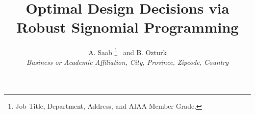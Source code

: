  \title{Optimal Design Decisions via Robust Signomial Programming}

 \author{
  A. Saab%
    \thanks{Job Title, Department, Address, and AIAA Member Grade.}
  \ and B. Ozturk\\
  {\normalsize\itshape
   Business or Academic Affiliation, City, Province, Zipcode, Country}\\
 }


 \newcommand{\eqnref}[1]{(\ref{#1})}
 \newcommand{\class}[1]{\texttt{#1}}
 \newcommand{\package}[1]{\texttt{#1}}
 \newcommand{\file}[1]{\texttt{#1}}
 \newcommand{\BibTeX}{\textsc{Bib}\TeX}

\renewcommand{\vec}{\mathbf}
\newcommand{\mat}{\mathbf}

\usepackage[utf8]{inputenc}
\usepackage{algorithm}
\usepackage{bbm}
\usepackage{amsmath}
\usepackage{amsthm}
\usepackage{amssymb}
\usepackage{multicol}
\usepackage{tabularx}
\usepackage[toc,page]{appendix}
\usepackage{verbatim}
\usepackage{tikz}
\usepackage{tkz-kiviat}
\usetikzlibrary{arrows}
 
 \newtheorem{theorem}{Theorem}[section]
 \newtheorem{corollary}{Corollary}[theorem]
 \newtheorem{lemma}[theorem]{Lemma}
 \newtheorem{proposition}[theorem]{Proposition}